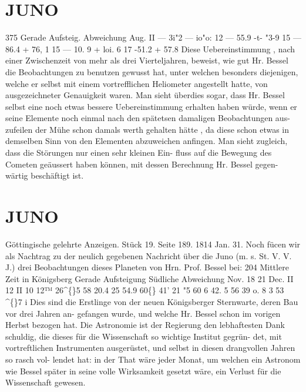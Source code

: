 \documentclass[12pt,a4paper]{article}
\newcommand{\degree}{\textdegree}
\begin{document}
\newpage

\section*{JUNO}
375 
Gerade 
Aufsteig. 
Abweichung 
Aug. 
II 
---  3i"2 
--- 
io"o: 
12 
---  55.9 
-t- 
"3-9 
15 
---  86.4 
+ 
76, 1 
15 
---  10.  9 
+ loi.  6 
17 
-51.2 
+ 
57.8 
Diese  Uebereinstimmung ,  nach  einer  Zwischenzeit  von  mehr  als  drei  Vierteljahren,  beweist,  wie 
gut  Hr.  Bessel  die  Beobachtungen  zu  benutzen  gewusst  hat,  unter  welchen  besonders  diejenigen,  welche 
er  selbst  mit  einem  vortrefflichen  Heliometer  angestellt  hatte,  von  ausgezeichneter  Genauigkeit  waren. 
Man  sieht  überdies  sogar,  dass  Hr.  Bessel  selbst  eine  noch  etwas  bessere  Uebereinstimmung  erhalten 
haben  würde,  wenn  er  seine  Elemente  noch  einmal  nach  den  spätetsen  damaligen  Beobachtungen  aus- 
zufeilen der  Mühe  schon  damals  werth  gehalten  hätte ,  da  diese  schon  etwas  in  demselben  Sinn  von  den 
Elementen  abzuweichen  anfingen.  Man  sieht  zugleich,  dass  die  Störungen  nur  einen  sehr  kleinen  Ein- 
fluss  auf  die  Bewegung  des  Cometen  geäussert  haben  können,  mit  dessen  Berechnung  Hr.  Bessel  gegen- 
wärtig beschäftigt  ist. 

\section*{JUNO}
Göttingische  gelehrte  Anzeigen.     Stück  19.  Seite  189.     1814  Jan.  31. 
Noch  fücen  wir  als  Nachtrag  zu  der  neulich  gegebenen  Nachricht   über  die  Juno  (m.  s.  St. 
V.  V.  J.)  drei  Beobachtungen  dieses  Planeten  von  Hrn.  Prof.  Bessel  bei: 
204 
Mittlere  Zeit 
in  Königsberg 
Gerade 
Aufsteigung 
Südliche 
Abweichung 
Nov.  18 
21 
Dec.  II 
12 
II 
10 
12™  26\textasciicircum\{\}5 
58  20.4 
25     54.9 
60\degree\{\}  41'  21  "5 
60  6  42. 5 
56     39       o.  8 
3     53    \textasciicircum\{\}7  i 
Dies  sind  die  Erstlinge  von  der  neuen  Königsberger  Sternwarte,  deren  Bau  vor  drei  Jahren  an- 
gefangen wurde,  und  welche  Hr.  Bessel  schon  im  vorigen  Herbst  bezogen  hat.  Die  Astronomie  ist  der 
Regierung  den  lebhaftesten  Dank  schuldig,  die  dieses  für  die  Wissenschaft  so  wichtige  Institut  gegrün- 
det, mit  vortreftlichen  Instrumenten  ausgerüstet,  und  selbst  in  diesen  drangvollen  Jahren  so  rasch  vol- 
lendet hat:  in  der  That  wäre  jeder  Monat,  um  welchen  ein  Astronom  wie  Bessel  später  in  seine  volle 
Wirksamkeit  gesetzt  wäre,  ein  Verlust  für  die  Wissenschaft  gewesen. 
\end{document}
